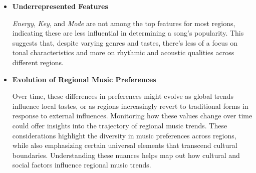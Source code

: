 \begin{itemize}
\item\textbf{Underrepresented Features}

\textit{Energy}, \textit{Key}, and \textit{Mode} are not among the top features for most regions, indicating these are less influential in determining a song’s popularity. This suggests that, despite varying genres and tastes, there’s less of a focus on tonal characteristics and more on rhythmic and acoustic qualities across different regions.

\item\textbf{Evolution of Regional Music Preferences}

Over time, these differences in preferences might evolve as global trends influence local tastes, or as
regions increasingly revert to traditional forms in response to external influences. Monitoring how
these values change over time could offer insights into the trajectory of regional music trends. These
considerations highlight the diversity in music preferences across regions, while also emphasizing
certain universal elements that transcend cultural boundaries. Understanding these nuances helps
map out how cultural and social factors influence regional music trends.

\end{itemize}